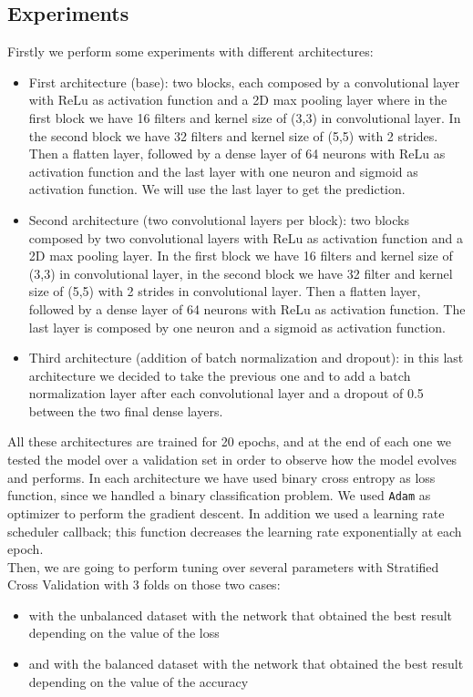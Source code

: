 \documentclass{article}
\begin{document}
\subsection{Experiments}
Firstly we perform some experiments with different architectures:
\begin{itemize}
    \item First architecture (base): two blocks, each composed by a convolutional layer with ReLu as activation function and a 2D max pooling layer where in the first block we have 16 filters and kernel size of (3,3) in convolutional layer. In the second block we have 32 filters and kernel size of (5,5) with 2 strides. Then a flatten layer, followed by a dense layer of 64 neurons with ReLu as activation function and the last layer with one neuron and sigmoid as activation function. We will use the last layer to get the prediction.
    \item Second architecture (two convolutional layers per block): two blocks composed by two convolutional layers with ReLu as activation function and a 2D max pooling layer. In the first block we have 16 filters and kernel size of (3,3) in convolutional layer, in the second block we have 32 filter and kernel size of (5,5) with 2 strides in convolutional layer. Then a flatten layer, followed by a dense layer of 64 neurons with ReLu as activation function. The last layer is composed by one neuron and a sigmoid as activation function.
    \item Third architecture (addition of batch normalization and dropout): in this last architecture we decided to take the previous one and to add a batch normalization layer after each convolutional layer and a dropout of 0.5 between the two final dense layers.
\end{itemize}

All these architectures are trained for 20 epochs, and at the end of each one we tested the model over a validation set in order to observe how the model evolves and performs. In each architecture we have used binary cross entropy as loss function, since we handled a binary classification problem. We used \texttt{Adam} as optimizer to perform the gradient descent. In addition we used a learning rate scheduler callback; this function decreases the learning rate exponentially at each epoch. \\

Then, we are going to perform tuning over several parameters with Stratified Cross Validation with 3 folds on those two cases:
\begin{itemize}
    \item with the unbalanced dataset with the network that obtained the best result depending on the value of the loss
    \item and with the balanced dataset with the network that obtained the best result depending on the value of the accuracy
\end{itemize}
\end{document}
